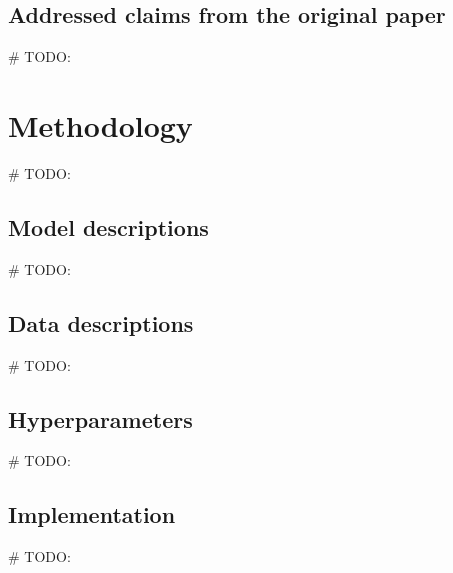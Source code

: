 \documentclass[11pt,a4paper]{article}
\begin{document}

\subsection{Addressed claims from the original paper}
\# TODO:


\section{Methodology}
\# TODO:

\subsection{Model descriptions}
\# TODO:

\subsection{Data descriptions}
\# TODO:

\subsection{Hyperparameters}
\# TODO:

\subsection{Implementation}
\# TODO:
\end{document}
